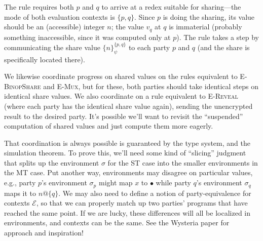 \documentclass[10pt]{article}
\makeatletter
\newcommand{\rulelab}[1]{{\small \textsc{#1}}}
\newcommand{\kw}[1]{\ensuremath{\mathtt{#1}}}
\newcommand{\ebinop}[2]{\ensuremath{{#1}~\oplus~{#2}}}
\newcommand{\ereveal}[4]{\ensuremath{\kw{reveal}^{#1}_{#4}~{#2}~{#3}}}
\newcommand{\eshare}[4]{\ensuremath{\kw{share}^{#2}_{#1}~{#3}~{#4}}}
\newcommand{\vshare}[3]{\ensuremath{\{{#3}\}^{#1}_{#2}}}
\newcommand{\vloc}[2]{\ensuremath{{#1}\kw{@}{#2}}}
\newcommand{\vcrash}{\ensuremath{\bullet}}
\newcommand{\env}{\ensuremath{\sigma}}
\newcommand{\ctxt}{\ensuremath{\mathcal{E}}}
\makeatother
\begin{document}
The rule requires both $p$ and $q$ to arrive at a redex suitable
for sharing---the mode of both evaluation contexts is
$\{p,q\}$. Since $p$ is doing the sharing, its value should be an
(accessible) integer $n$; the value $v_q$ at $q$ is immaterial
(probably something inaccessible, since it was computed only at $p$).
The rule takes a step by communicating the share
value $\vshare{\{p,q\}}{\psi}{n}$ to each party $p$ and $q$ (and the
share is specifically located there).

We likewise coordinate progress on shared values on the rules
equivalent to \rulelab{E-BinopShare} and \rulelab{E-Mux}, but for
these, both parties should take identical steps on identical share
values. We also coordinate on a rule equivalent to \rulelab{E-Reveal}
(where each party has the identical share value again), sending the
unencrypted result to the desired party. It's possible we'll want to
revisit the ``suspended'' computation of shared values and just
compute them more eagerly.

That coordination is always possible is guaranteed by the type system,
and the simulation theorem. To prove this, we'll need some kind of
``slicing'' judgment that splits up the environment $\env$ for the ST
case into the smaller environments in the MT case. Put another way,
environments may disagree on particular values, e.g., party $p$'s
environment $\env_p$ might map $x$ to $\vcrash$ while party $q$'s
environment $\env_q$ maps it to $\vloc{n}{\{q\}}$. We may also need to
define a notion of party-equivalence for contexts $\ctxt$, so that we
can properly match up two parties' programs that have reached the same
point. If we are lucky, these differences will all be localized in
environments, and contexts can be the same. See the Wysteria paper for
approach and inspiration!

\end{document}

